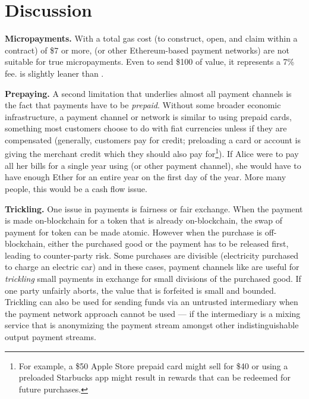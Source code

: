 
\section{Discussion}

\textbf{Micropayments.} With a total gas cost (to construct, open, and claim within a contract) of \$7 or more, \ew (or other Ethereum-based payment networks) are not suitable for true micropayments. Even to send \$100 of value, it represents a 7\% fee. \eww is slightly leaner than \ew {}.

\textbf{Prepaying.} A second limitation that underlies almost all payment channels is the fact that payments have to be \textit{prepaid}. Without some broader economic infrastructure, a payment channel or network is similar to using prepaid cards, something most customers choose to do with fiat currencies unless if they are  compensated (generally, customers pay for credit; preloading a card or account is giving the merchant credit which they should also pay for\footnote{For example, a \$50 Apple Store prepaid card might sell for \$40 or using a preloaded Starbucks app might result in rewards that can be redeemed for future purchases.}). If Alice were to pay all her bills for a single year using \ew (or other payment channel), she would have to have enough Ether for an entire year on the first day of the year. More many people, this would be a cash flow issue. 

\textbf{Trickling.} One issue in payments is fairness or fair exchange. When the payment is made on-blockchain for a token that is already on-blockchain, the swap of payment for token can be made atomic. However when the purchase is off-blockchain, either the purchased good or the payment has to be released first, leading to counter-party risk. Some purchases are divisible (\eg electricity purchased to charge an electric car) and in these cases, payment channels like \ew are useful for \textit{trickling} small payments in exchange for small divisions of the purchased good. If one party unfairly aborts, the value that is forfeited is small and bounded. Trickling can also be used for sending funds via an untrusted intermediary when the payment network approach cannot be used --- \eg if the intermediary is a mixing service that is anonymizing the payment stream amongst other indistinguishable output payment streams.

